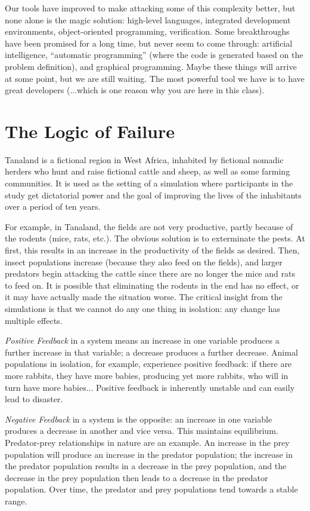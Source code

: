 Our tools have improved to make attacking some of this complexity better, but none alone is the magic solution: high-level languages, integrated development environments, object-oriented programming, verification. Some breakthroughs have been promised for a long time, but never seem to come through: artificial intelligence, ``automatic programming'' (where the code is generated based on the problem definition), and graphical programming. Maybe these things will arrive at some point, but we are still waiting. The most powerful tool we have is to have great developers (...which is one reason why you are here in this class).



\section*{The Logic of Failure}

Tanaland is a fictional region in West Africa, inhabited by fictional nomadic herders who hunt and raise fictional cattle and sheep, as well as some farming communities. It is used as the setting of a simulation where participants in the study get dictatorial power and the goal of improving the lives of the inhabitants over a period of ten years. 

For example, in Tanaland, the fields are not very productive, partly because of the rodents (mice, rats, etc.). The obvious solution is to exterminate the pests. At first, this results in an increase in the productivity of the fields as desired. Then, insect populations increase (because they also feed on the fields), and larger predators begin attacking the cattle since there are no longer the mice and rats to feed on. It is possible that eliminating the rodents in the end has no effect, or it may have actually made the situation worse. The critical insight from the simulations is that we cannot do any one thing in isolation: any change has multiple effects.

\textit{Positive Feedback} in a system means an increase in one variable produces a further increase in that variable; a decrease produces a further decrease. Animal populations in isolation, for example, experience positive feedback: if there are more rabbits, they have more babies, producing yet more rabbits, who will in turn have more babies... Positive feedback is inherently unstable and can easily lead to disaster.

\textit{Negative Feedback} in a system is the opposite: an increase in one variable produces a decrease in another and vice versa. This maintains equilibrium. Predator-prey relationships in nature are an example. An increase in the prey population will produce an increase in the predator population; the increase in the predator population results in a decrease in the prey population, and the decrease in the prey population then leads to a decrease in the predator population. Over time, the predator and prey populations tend towards a stable range.

